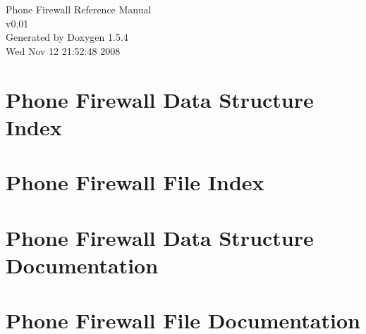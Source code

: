 \documentclass[a4paper]{book}
\begin{document}
\begin{titlepage}
\vspace*{7cm}
\begin{center}
{\Large Phone Firewall Reference Manual\\[1ex]\large v0.01 }\\
\vspace*{1cm}
{\large Generated by Doxygen 1.5.4}\\
\vspace*{0.5cm}
{\small Wed Nov 12 21:52:48 2008}\\
\end{center}
\end{titlepage}
\clearemptydoublepage
{}
\tableofcontents
\clearemptydoublepage
{}
\chapter{Phone Firewall Data Structure Index}

\chapter{Phone Firewall File Index}

\chapter{Phone Firewall Data Structure Documentation}


\chapter{Phone Firewall File Documentation}







\printindex
\end{document}
